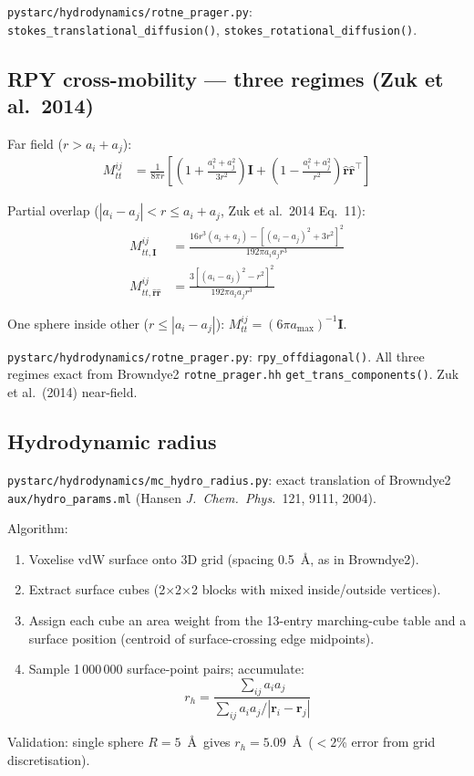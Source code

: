 \documentclass[12pt,a4paper]{article}
\newcommand{\bI}{\mathbf{I}}
\newcommand{\rhat}{\hat{\mathbf{r}}}
\newcommand{\OK}{\textcolor{cgreen}{\checkmark}}
\begin{document}
\begin{samebox}
\texttt{pystarc/hydrodynamics/rotne\_prager.py}:
\texttt{stokes\_translational\_diffusion()}, \texttt{stokes\_rotational\_diffusion()}. \OK
\end{samebox}

\subsection{RPY cross-mobility --- three regimes (Zuk et al.~2014)}

Far field ($r > a_i + a_j$):
\begin{align}
M_{tt}^{ij} &= \frac{1}{8\pi r}
\left[\left(1 + \frac{a_i^2+a_j^2}{3r^2}\right)\bI
+\left(1-\frac{a_i^2+a_j^2}{r^2}\right)\rhat\rhat^\top\right]
\end{align}

Partial overlap ($|a_i-a_j| < r \leq a_i+a_j$, Zuk et al.\ 2014 Eq.~11):
\begin{align}
M_{tt,\bI}^{ij} &= \frac{16r^3(a_i+a_j) - [(a_i-a_j)^2+3r^2]^2}{192\pi a_i a_j r^3}\\
M_{tt,\rhat\rhat}^{ij} &= \frac{3[(a_i-a_j)^2-r^2]^2}{192\pi a_i a_j r^3}
\end{align}

One sphere inside other ($r\leq|a_i-a_j|$): $M_{tt}^{ij} = (6\pi a_\mathrm{max})^{-1}\bI$.

\begin{samebox}
\texttt{pystarc/hydrodynamics/rotne\_prager.py}: \texttt{rpy\_offdiagonal()}.
All three regimes exact from Browndye2 \texttt{rotne\_prager.hh}
\texttt{get\_trans\_components()}.  Zuk et al.\ (2014) near-field. \OK
\end{samebox}

\subsection{Hydrodynamic radius}

\begin{samebox}
\texttt{pystarc/hydrodynamics/mc\_hydro\_radius.py}:
exact translation of Browndye2 \texttt{aux/hydro\_params.ml}
(Hansen \textit{J.\ Chem.\ Phys.}\ 121, 9111, 2004).

Algorithm:
\begin{enumerate}[nosep]
\item Voxelise vdW surface onto 3D grid (spacing 0.5~\AA, as in Browndye2).
\item Extract surface cubes (2$\times$2$\times$2 blocks with mixed inside/outside vertices).
\item Assign each cube an area weight from the 13-entry marching-cube table
  and a surface position (centroid of surface-crossing edge midpoints).
\item Sample 1\,000\,000 surface-point pairs; accumulate:
\begin{equation}
r_h = \frac{\displaystyle\sum_{ij} a_i a_j}
           {\displaystyle\sum_{ij} a_i a_j / |\mathbf{r}_i - \mathbf{r}_j|}
\end{equation}
\end{enumerate}
Validation: single sphere $R=5$~\AA\ gives $r_h = 5.09$~\AA\ ($< 2$\% error
from grid discretisation). \OK
\end{samebox}
\end{document}
